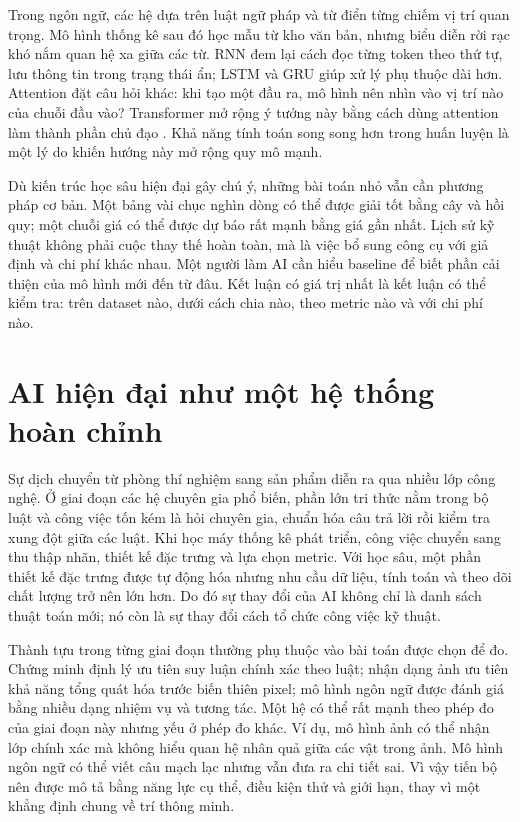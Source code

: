 \documentclass[12pt,a4paper]{report}
\begin{document}
Trong ngôn ngữ, các hệ dựa trên luật ngữ pháp và từ điển từng chiếm vị trí quan trọng. Mô hình thống kê sau đó học mẫu từ kho văn bản, nhưng biểu diễn rời rạc khó nắm quan hệ xa giữa các từ. RNN đem lại cách đọc từng token theo thứ tự, lưu thông tin trong trạng thái ẩn; LSTM và GRU giúp xử lý phụ thuộc dài hơn. Attention đặt câu hỏi khác: khi tạo một đầu ra, mô hình nên nhìn vào vị trí nào của chuỗi đầu vào? Transformer mở rộng ý tưởng này bằng cách dùng attention làm thành phần chủ đạo \cite{transformer2017}. Khả năng tính toán song song hơn trong huấn luyện là một lý do khiến hướng này mở rộng quy mô mạnh.

Dù kiến trúc học sâu hiện đại gây chú ý, những bài toán nhỏ vẫn cần phương pháp cơ bản. Một bảng vài chục nghìn dòng có thể được giải tốt bằng cây và hồi quy; một chuỗi giá có thể được dự báo rất mạnh bằng giá gần nhất. Lịch sử kỹ thuật không phải cuộc thay thế hoàn toàn, mà là việc bổ sung công cụ với giả định và chi phí khác nhau. Một người làm AI cần hiểu baseline để biết phần cải thiện của mô hình mới đến từ đâu. Kết luận có giá trị nhất là kết luận có thể kiểm tra: trên dataset nào, dưới cách chia nào, theo metric nào và với chi phí nào.

\section{AI hiện đại như một hệ thống hoàn chỉnh}
Sự dịch chuyển từ phòng thí nghiệm sang sản phẩm diễn ra qua nhiều lớp công nghệ. Ở giai đoạn các hệ chuyên gia phổ biến, phần lớn tri thức nằm trong bộ luật và công việc tốn kém là hỏi chuyên gia, chuẩn hóa câu trả lời rồi kiểm tra xung đột giữa các luật. Khi học máy thống kê phát triển, công việc chuyển sang thu thập nhãn, thiết kế đặc trưng và lựa chọn metric. Với học sâu, một phần thiết kế đặc trưng được tự động hóa nhưng nhu cầu dữ liệu, tính toán và theo dõi chất lượng trở nên lớn hơn. Do đó sự thay đổi của AI không chỉ là danh sách thuật toán mới; nó còn là sự thay đổi cách tổ chức công việc kỹ thuật.

Thành tựu trong từng giai đoạn thường phụ thuộc vào bài toán được chọn để đo. Chứng minh định lý ưu tiên suy luận chính xác theo luật; nhận dạng ảnh ưu tiên khả năng tổng quát hóa trước biến thiên pixel; mô hình ngôn ngữ được đánh giá bằng nhiều dạng nhiệm vụ và tương tác. Một hệ có thể rất mạnh theo phép đo của giai đoạn này nhưng yếu ở phép đo khác. Ví dụ, mô hình ảnh có thể nhận lớp chính xác mà không hiểu quan hệ nhân quả giữa các vật trong ảnh. Mô hình ngôn ngữ có thể viết câu mạch lạc nhưng vẫn đưa ra chi tiết sai. Vì vậy tiến bộ nên được mô tả bằng năng lực cụ thể, điều kiện thử và giới hạn, thay vì một khẳng định chung về trí thông minh.
\end{document}
